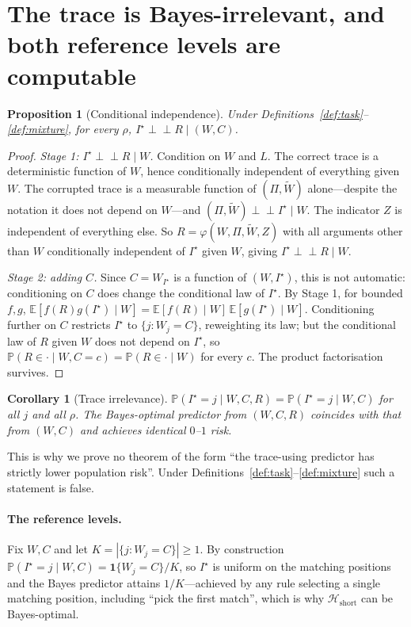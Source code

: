 \documentclass{article}
\theoremstyle{plain}
\newtheorem{proposition}{Proposition}
\newtheorem{corollary}{Corollary}
\theoremstyle{definition}
\theoremstyle{remark}
\newcommand{\E}{\mathbb{E}}
\newcommand{\Prob}{\mathbb{P}}
\newcommand{\1}{\mathbf{1}}
\newcommand{\cH}{\mathcal{H}}
\newcommand{\indep}{\perp\!\!\!\perp}
\begin{document}
\section{The trace is Bayes-irrelevant, and both reference levels are computable}
\label{sec:bayes}

\begin{proposition}[Conditional independence]
\label{prop:indep}
Under Definitions~\ref{def:task}--\ref{def:mixture}, for every $\rho$,
$I^\star \indep R \mid (W,C)$.
\end{proposition}

\begin{proof}
\emph{Stage 1: $I^\star\indep R\mid W$.} Condition on $W$ and $L$. The correct
trace is a deterministic function of $W$, hence conditionally independent of
everything given $W$. The corrupted trace is a measurable function of
$(\Pi,\widetilde W)$ alone---despite the notation it does not depend on
$W$---and $(\Pi,\widetilde W)\indep I^\star\mid W$. The indicator $Z$ is
independent of everything else. So $R = \varphi(W,\Pi,\widetilde W,Z)$ with all
arguments other than $W$ conditionally independent of $I^\star$ given $W$, giving
$I^\star\indep R\mid W$.

\emph{Stage 2: adding $C$.} Since $C = W_{I^\star}$ is a function of
$(W,I^\star)$, this is not automatic: conditioning on $C$ does change the
conditional law of $I^\star$. By Stage 1, for bounded $f,g$,
$\E[f(R)g(I^\star)\mid W] = \E[f(R)\mid W]\,\E[g(I^\star)\mid W]$. Conditioning
further on $C$ restricts $I^\star$ to $\{j : W_j = C\}$, reweighting its law; but
the conditional law of $R$ given $W$ does not depend on $I^\star$, so
$\Prob(R\in\cdot\mid W,C=c) = \Prob(R\in\cdot\mid W)$ for every $c$. The product
factorisation survives.
\end{proof}

\begin{corollary}[Trace irrelevance]
\label{cor:irrelevance}
$\Prob(I^\star = j\mid W,C,R) = \Prob(I^\star = j\mid W,C)$ for all $j$ and all
$\rho$. The Bayes-optimal predictor from $(W,C,R)$ coincides with that from
$(W,C)$ and achieves identical $0$--$1$ risk.
\end{corollary}

This is why we prove no theorem of the form ``the trace-using predictor has
strictly lower population risk''. Under
Definitions~\ref{def:task}--\ref{def:mixture} such a statement is false.

\paragraph{The reference levels.}
Fix $W,C$ and let $K = |\{j : W_j = C\}|\ge1$. By construction
$\Prob(I^\star = j\mid W,C) = \1\{W_j = C\}/K$, so $I^\star$ is uniform on the
matching positions and the Bayes predictor attains $1/K$---achieved by any rule
selecting a single matching position, including ``pick the first match'', which
is why $\cH_{\mathrm{short}}$ can be Bayes-optimal.
\end{document}
